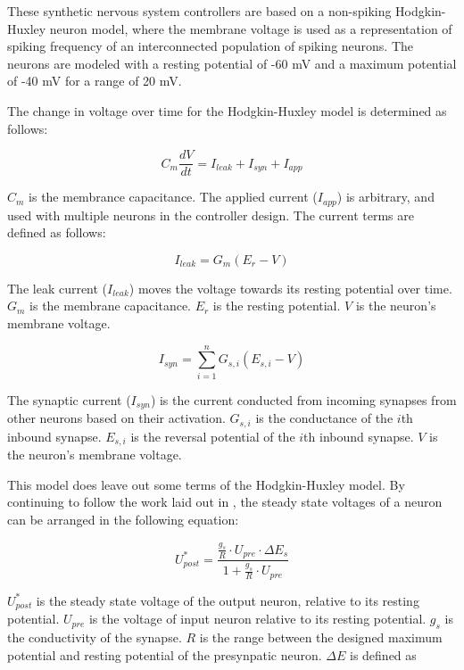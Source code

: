 These synthetic nervous system controllers are based on a non-spiking Hodgkin-Huxley neuron model, where the membrane voltage is used as a representation of spiking frequency of an interconnected population of spiking neurons. The neurons are modeled with a resting potential of -60 mV and a maximum potential of -40 mV for a range of 20 mV.

The change in voltage over time for the Hodgkin-Huxley model is determined as follows:

\begin{equation}
C_{m} \dfrac{d V}{d t} = I_{leak} + I_{syn} + I_{app}
\end{equation}

$C_{m}$ is the membrance capacitance.
The applied current ($I_{app}$) is arbitrary, and used with multiple neurons in the controller design.
The current terms are defined as follows:

\begin{equation}
I_{leak} = G_{m} (E_{r} - V)
\end{equation}

The leak current ($I_{leak}$) moves the voltage towards its resting potential over time. $G_{m}$ is the membrane capacitance. $E_{r}$ is the resting potential. $V$ is the neuron's membrane voltage.

\begin{equation}
I_{syn} = \sum_{i=1}^{n} G_{s, i} (E_{s, i} - V)
\end{equation}

The synaptic current ($I_{syn}$) is the current conducted from incoming synapses from other neurons based on their activation.
$G_{s, i}$ is the conductance of the $i$th inbound synapse. $E_{s, i}$ is the reversal potential of the $i$th inbound synapse.
$V$ is the neuron's membrane voltage.

This model does leave out some terms of the Hodgkin-Huxley model. By continuing to follow the work laid out in \cite{NickFunctionalSubnetwork}, the steady state voltages of a neuron can be arranged in the following equation:

\begin{equation}
U_{post}^{*} = \dfrac{\frac{g_{s}}{R} \cdot U_{pre} \cdot \Delta E_{s}}{1 + \frac{g_{s}}{R} \cdot U_{pre}}
\end{equation}

$U_{post}^{*}$ is the steady state voltage of the output neuron, relative to its resting potential. $U_{pre}$ is the voltage of input neuron relative to its resting potential. $g_{s}$ is the conductivity of the synapse.
$R$ is the range between the designed maximum potential and resting potential of the presynpatic neuron. $\Delta E$ is defined as 

